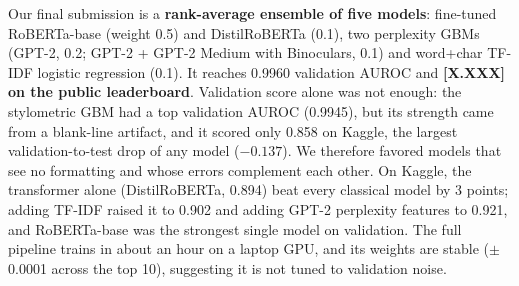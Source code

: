 Our final submission is a \textbf{rank-average ensemble of five models}:
fine-tuned RoBERTa-base (weight 0.5) and DistilRoBERTa (0.1), two perplexity
GBMs (GPT-2, 0.2; GPT-2 + GPT-2 Medium with Binoculars, 0.1) and word+char
TF-IDF logistic regression (0.1). It reaches 0.9960 validation AUROC and
\textbf{[X.XXX] on the public leaderboard}. Validation score alone was not
enough: the stylometric GBM had a top validation AUROC (0.9945), but its strength
came from a blank-line artifact, and it scored only 0.858 on Kaggle, the largest
validation-to-test drop of any model ($-0.137$). We therefore favored models that
see no formatting and whose errors complement each other. On Kaggle, the
transformer alone (DistilRoBERTa, 0.894) beat every classical model by 3 points;
adding TF-IDF raised it to 0.902 and adding GPT-2 perplexity features to 0.921,
and RoBERTa-base was the strongest single model on validation. The full pipeline
trains in about an hour on a laptop GPU, and its weights are stable ($\pm$0.0001
across the top 10), suggesting it is not tuned to validation noise.

